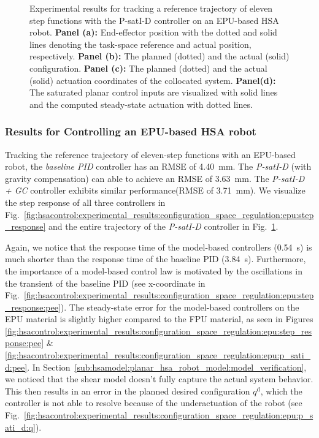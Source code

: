 \begin{figure}[ht]
    \caption{Experimental results for tracking a reference trajectory of eleven step functions with the P-satI-D controller on an EPU-based HSA robot. \textbf{Panel (a):} End-effector position with the dotted and solid lines denoting the task-space reference and actual position, respectively.
    \textbf{Panel (b):} The planned (dotted) and the actual (solid) configuration. 
    \textbf{Panel (c):} The planned (dotted) and the actual (solid) actuation coordinates of the collocated system. 
    \textbf{Panel(d):} The saturated planar control inputs are visualized with solid lines and the computed steady-state actuation with dotted lines.}\label{fig:hsacontrol:experimental_results:configuration_space_regulation:epu:p_sati_d}
\end{figure}

\subsubsection{Results for Controlling an EPU-based HSA robot}
Tracking the reference trajectory of eleven-step functions with an EPU-based robot, the \emph{baseline PID} controller has an \gls{RMSE} of \SI{4.40}{mm}. The \emph{P-satI-D} (with gravity compensation) can able to achieve an \gls{RMSE} of \SI{3.63}{mm}. The \emph{P-satI-D + GC} controller exhibits similar performance(\gls{RMSE} of \SI{3.71}{mm}).
We visualize the step response of all three controllers in Fig.~\ref{fig:hsacontrol:experimental_results:configuration_space_regulation:epu:step_response} and the entire trajectory of the \emph{P-satI-D} controller in Fig.~\ref{fig:hsacontrol:experimental_results:configuration_space_regulation:epu:p_sati_d}.

Again, we notice that the response time of the model-based controllers (\SI{0.54}{s}) is much shorter than the response time of the baseline PID (\SI{3.84}{s}). Furthermore, the importance of a model-based control law is motivated by the oscillations in the transient of the baseline PID (see x-coordinate in Fig.~\ref{fig:hsacontrol:experimental_results:configuration_space_regulation:epu:step_response:pee}).
The steady-state error for the model-based controllers on the EPU material is slightly higher compared to the FPU material, as seen in Figures \ref{fig:hsacontrol:experimental_results:configuration_space_regulation:epu:step_response:pee} \& \ref{fig:hsacontrol:experimental_results:configuration_space_regulation:epu:p_sati_d:pee}. In Section~\ref{sub:hsamodel:planar_hsa_robot_model:model_verification}, we noticed that the shear model doesn't fully capture the actual system behavior. This then results in an error in the planned desired configuration $q^\mathrm{d}$, which the controller is not able to resolve because of the underactuation of the robot (see Fig.~\ref{fig:hsacontrol:experimental_results:configuration_space_regulation:epu:p_sati_d:q}).